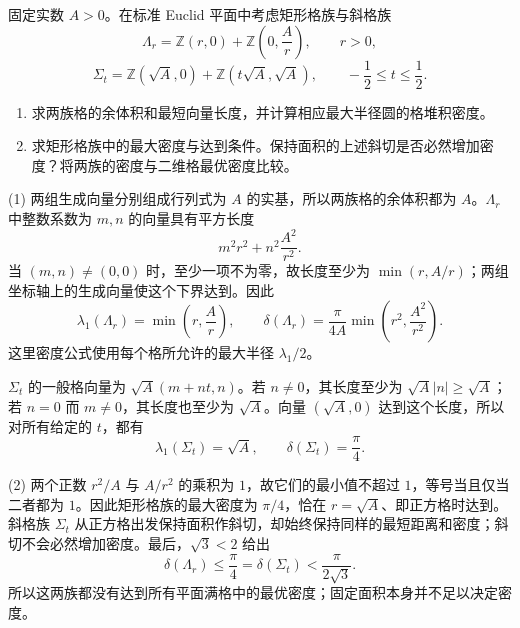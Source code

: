\begin{exercise}
	\label{g1:ex:fixed-area-lattice-families}
	固定实数 \(A>0\)。在标准 Euclid 平面中考虑矩形格族与斜格族
	\[
		\Lambda_r=\mathbb Z(r,0)+\mathbb Z\left(0,\frac Ar\right),\qquad r>0,
	\]
	\[
		\Sigma_t=\mathbb Z(\sqrt A,0)+\mathbb Z(t\sqrt A,\sqrt A),\qquad
		-\frac12\le t\le\frac12.
	\]
	\begin{enumerate}
		\item 求两族格的余体积和最短向量长度，并计算相应最大半径圆的格堆积密度。
		\item 求矩形格族中的最大密度与达到条件。保持面积的上述斜切是否必然增加密度？将两族的密度与二维格最优密度比较。
	\end{enumerate}
\end{exercise}
\begin{solution}
	(1) 两组生成向量分别组成行列式为 \(A\) 的实基，所以两族格的余体积都为 \(A\)。\(\Lambda_r\) 中整数系数为 \(m,n\) 的向量具有平方长度
	\[
		m^2r^2+n^2\frac{A^2}{r^2}.
	\]
	当 \((m,n)\ne(0,0)\) 时，至少一项不为零，故长度至少为 \(\min(r,A/r)\)；两组坐标轴上的生成向量使这个下界达到。因此
	\[
		\lambda_1(\Lambda_r)=\min\left(r,\frac Ar\right),\qquad
		\delta(\Lambda_r)=\frac{\pi}{4A}\min\left(r^2,\frac{A^2}{r^2}\right).
	\]
	这里密度公式使用每个格所允许的最大半径 \(\lambda_1/2\)。

	\(\Sigma_t\) 的一般格向量为 \(\sqrt A(m+nt,n)\)。若 \(n\ne0\)，其长度至少为 \(\sqrt A|n|\ge\sqrt A\)；若 \(n=0\) 而 \(m\ne0\)，其长度也至少为 \(\sqrt A\)。向量 \((\sqrt A,0)\) 达到这个长度，所以对所有给定的 \(t\)，都有
	\[
		\lambda_1(\Sigma_t)=\sqrt A,\qquad \delta(\Sigma_t)=\frac\pi4.
	\]

	(2) 两个正数 \(r^2/A\) 与 \(A/r^2\) 的乘积为 \(1\)，故它们的最小值不超过 \(1\)，等号当且仅当二者都为 \(1\)。因此矩形格族的最大密度为 \(\pi/4\)，恰在 \(r=\sqrt A\)、即正方格时达到。斜格族 \(\Sigma_t\) 从正方格出发保持面积作斜切，却始终保持同样的最短距离和密度；斜切不会必然增加密度。最后，\(\sqrt3<2\) 给出
	\[
		\delta(\Lambda_r)\le\frac\pi4
		=\delta(\Sigma_t)<\frac{\pi}{2\sqrt3}.
	\]
	所以这两族都没有达到所有平面满格中的最优密度；固定面积本身并不足以决定密度。
\end{solution}

